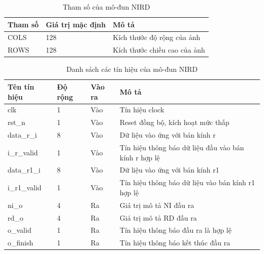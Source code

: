 \begin{table}[!ht]
    \centering
    \renewcommand{\arraystretch}{1.3} %
        \caption{Tham số của mô-đun NIRD}
    \begin{tabular}{|p{3cm} p{4cm} p{8cm}|}
        \hline
        \rowcolor{gray!30}
        \textbf{Tham số } & \textbf{Giá trị mặc định}  & \textbf{Mô tả} \\
        \hline
        COLS & 128 & Kích thước độ rộng của ảnh
        \\ \hline
        ROWS & 128 & Kích thước chiều cao của ảnh
        \\
        \hline
    \end{tabular}

    \label{tab:paramListNIRD}
\end{table}
\begin{table}[!ht]
    \centering
    \renewcommand{\arraystretch}{1.3} %
        \caption{Danh sách các tín hiệu của mô-đun NIRD}
    \begin{tabular}{|p{3cm} p{2cm} p{2cm} p{8cm}|}
        \hline
        \rowcolor{gray!30}
        \textbf{Tên tín hiệu} & \textbf{Độ rộng} & \textbf{Vào ra} & \textbf{Mô tả} \\
        \hline
        clk & 1 & Vào & Tín hiệu clock \\
        \hline
        rst\_n & 1 & Vào & Reset đồng bộ, kích hoạt mức thấp \\
        \hline 
        data\_r\_i & 8  & Vào &  Dữ liệu vào ứng với bán kính r
        \\ \hline
        i\_r\_valid & 1 & Vào & Tín hiệu thông báo dữ liệu đầu vào bán kính r hợp lệ
        \\ \hline
        data\_r1\_i & 8 & Vào & Dữ liệu vào ứng với bán kính r1
        \\ \hline
        i\_r1\_valid & 1 & Vào & Tín hiệu thông báo dữ liệu vào bán kính r1 hợp lệ
        \\ \hline
        ni\_o & 4 & Ra & Giá trị mô tả NI đầu ra
        \\ \hline
        rd\_o & 4 & Ra & Giá trị mô tả RD đầu ra
        \\ \hline
        o\_valid & 1 & Ra & Tín hiệu thông báo đầu ra là hợp lệ
        \\ \hline
        o\_finish & 1 & Ra & Tín hiệu thông báo kết thúc đầu ra
        \\ \hline
       
    \end{tabular}

    \label{tab:signalListNIRD}
\end{table}


